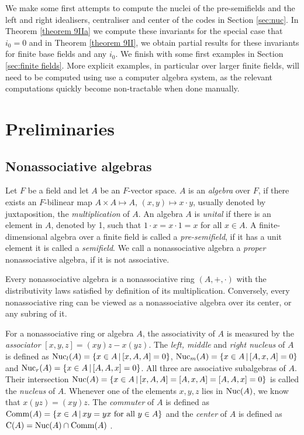 \documentclass[12pt]{amsart}
\theoremstyle{plain}
\theoremstyle{definition}
\numberwithin{equation}{section}
\numberwithin{figure}{section}
\begin{document}
We make some first attempts to compute the nuclei of the pre-semifields and the left and right idealisers, centraliser and center  of the codes  in Section \ref{sec:nuc}.  In Theorem \ref{theorem 9IIa}  we compute these invariants  for
 the special case that $i_0=0$ and in Theorem \ref{theorem 9II}, we obtain partial results for these invariants for finite base fields and any $i_0$. We finish with some first examples in Section \ref{sec:finite fields}. More explicit examples, in particular over larger finite fields, will need to be computed using use a computer algebra system, as the relevant computations quickly become non-tractable when done manually.


\section{Preliminaries}


\subsection{Nonassociative algebras} \label{subsec:1}

Let $F$ be a field and let $A$ be an $F$-vector space. $A$ is an \emph{algebra} over $F$, if there exists an $F$-bilinear
map $A\times A\mapsto A$, $(x,y) \mapsto x \cdot y$, usually denoted
by juxtaposition, the  \emph{multiplication} of $A$. An algebra
$A$ is  \emph{unital} if there is an element in $A$, denoted by 1, such that $1\cdot x=x\cdot 1=x$ for all $x\in A$.
A finite-dimensional algebra over a finite field is called a \emph{pre-semifield}, if it has a unit element it is called a \emph{semifield}.
 We call a nonassociative algebra a \emph{proper} nonassociative algebra, if it is not associative.


Every nonassociative algebra is a  nonassociative ring $(A,+,\cdot)$ with the distributivity laws satisfied by definition of its multiplication. Conversely, every nonassociative ring can be viewed as a nonassociative algebra over its center, or any subring of it.


For a nonassociative ring or  algebra $A$, the associativity of $A$ is measured by the {\it
associator} $[x, y, z] = (xy) z - x (yz)$. The \emph{left, middle} and \emph{right nucleus} of
$A$ is defined as ${\rm Nuc}_l(A) = \{ x \in A \, \vert \, [x, A, A]
= 0 \}$, ${\rm Nuc}_m(A) = \{ x \in A \,
\vert \, [A, x, A]  = 0 \}$ and  ${\rm
Nuc}_r(A) = \{ x \in A \, \vert \, [A,A, x]  = 0 \}$. All three are associative
subalgebras of $A$. Their intersection
 ${\rm Nuc}(A) = \{ x \in A \, \vert \, [x, A, A] = [A, x, A] = [A,A, x] = 0 \}$ is called the {\it nucleus} of $A$. Whenever one of the elements
 $x, y, z$ lies in
${\rm Nuc}(A)$, we know that $x(yz) = (xy) z$. The  {\it commuter} of $A$ is defined as ${\rm
Comm}(A)=\{x\in A\,|\,xy=yx \text{ for all }y\in A\}$ and the {\it
center} of $A$ is defined as ${\rm C}(A)=\text{Nuc}(A)\cap  {\rm Comm}(A)$ \cite{Sch}.
\end{document}
